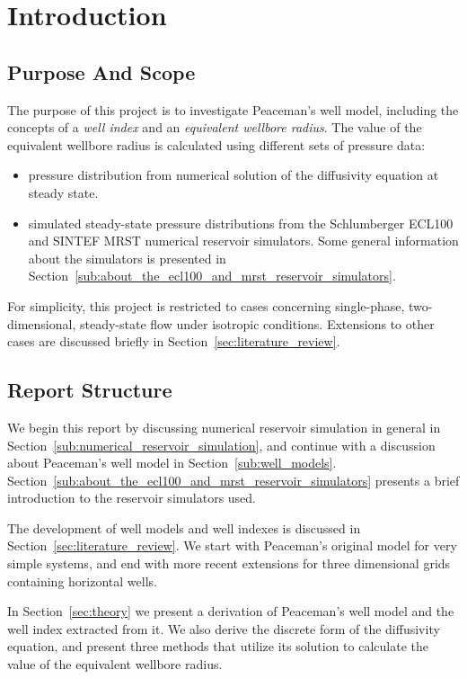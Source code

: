 
\section{Introduction} %
\label{sec:introduction}
\subsection{Purpose And Scope} %
\label{sub:purpose_and_scope}
The purpose of this project is to investigate Peaceman's well model, including the concepts of a \emph{well index} and an \emph{equivalent wellbore radius}. The value of the equivalent wellbore radius is calculated using different sets of  pressure data:
\begin{itemize}
    \item pressure distribution from numerical solution of the diffusivity equation at steady state.
    \item simulated steady-state pressure distributions from the Schlumberger ECL100 and SINTEF MRST numerical reservoir simulators. Some general information about the simulators is presented in Section~\ref{sub:about_the_ecl100_and_mrst_reservoir_simulators}.
\end{itemize}

For simplicity, this project is restricted to cases concerning single-phase, two-dimensional, steady-state flow under isotropic conditions. Extensions to other cases are discussed briefly in Section~\ref{sec:literature_review}.

\subsection{Report Structure} %
\label{sub:report_structure}
We begin this report by discussing numerical reservoir simulation in general in Section~\ref{sub:numerical_reservoir_simulation}, and continue with a discussion about Peaceman's well model in Section~\ref{sub:well_models}. Section~\ref{sub:about_the_ecl100_and_mrst_reservoir_simulators} presents a brief introduction to the reservoir simulators used.

The development of well models and well indexes is discussed in Section~\ref{sec:literature_review}. We start with Peaceman's original model for very simple systems, and end with more recent extensions for three dimensional grids containing horizontal wells.

In Section~\ref{sec:theory} we present a derivation of Peaceman's well model and the well index extracted from it. We also derive the discrete form of the diffusivity equation, and present three methods that utilize its solution to calculate the value of the equivalent wellbore radius.

